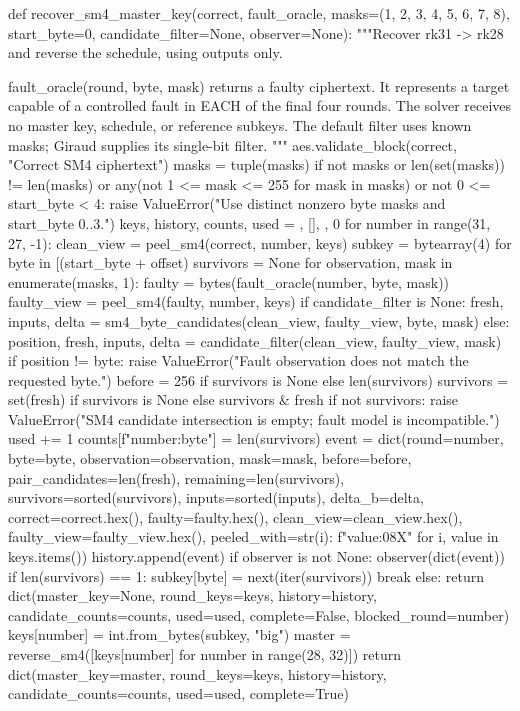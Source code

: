 \begin{lightcode}
def recover_sm4_master_key(correct, fault_oracle, masks=(1, 2, 3, 4, 5, 6, 7, 8), start_byte=0, candidate_filter=None, observer=None):
    """Recover rk31 -> rk28 and reverse the schedule, using outputs only.

    fault_oracle(round, byte, mask) returns a faulty ciphertext. It represents
    a target capable of a controlled fault in EACH of the final four rounds.
    The solver receives no master key, schedule, or reference subkeys.
    The default filter uses known masks; Giraud supplies its single-bit filter.
    """
    aes.validate_block(correct, "Correct SM4 ciphertext")
    masks = tuple(masks)
    if not masks or len(set(masks)) != len(masks) or any(not 1 <= mask <= 255 for mask in masks) or not 0 <= start_byte < 4:
        raise ValueError("Use distinct nonzero byte masks and start_byte 0..3.")
    keys, history, counts, used = {}, [], {}, 0
    for number in range(31, 27, -1):
        clean_view = peel_sm4(correct, number, keys)
        subkey = bytearray(4)
        for byte in [(start_byte + offset) %
            survivors = None
            for observation, mask in enumerate(masks, 1):
                faulty = bytes(fault_oracle(number, byte, mask))
                faulty_view = peel_sm4(faulty, number, keys)
                if candidate_filter is None:
                    fresh, inputs, delta = sm4_byte_candidates(clean_view, faulty_view, byte, mask)
                else:
                    position, fresh, inputs, delta = candidate_filter(clean_view, faulty_view, mask)
                    if position != byte:
                        raise ValueError("Fault observation does not match the requested byte.")
                before = 256 if survivors is None else len(survivors)
                survivors = set(fresh) if survivors is None else survivors & fresh
                if not survivors:
                    raise ValueError("SM4 candidate intersection is empty; fault model is incompatible.")
                used += 1
                counts[f"{number}:{byte}"] = len(survivors)
                event = dict(round=number, byte=byte, observation=observation, mask=mask, before=before, pair_candidates=len(fresh), remaining=len(survivors), survivors=sorted(survivors), inputs=sorted(inputs), delta_b=delta, correct=correct.hex(), faulty=faulty.hex(), clean_view=clean_view.hex(), faulty_view=faulty_view.hex(), peeled_with={str(i): f"{value:08X}" for i, value in keys.items()})
                history.append(event)
                if observer is not None:
                    observer(dict(event))
                if len(survivors) == 1:
                    subkey[byte] = next(iter(survivors))
                    break
            else:
                return dict(master_key=None, round_keys=keys, history=history, candidate_counts=counts, used=used, complete=False, blocked_round=number)
        keys[number] = int.from_bytes(subkey, "big")
    master = reverse_sm4([keys[number] for number in range(28, 32)])
    return dict(master_key=master, round_keys=keys, history=history, candidate_counts=counts, used=used, complete=True)
\end{lightcode}
